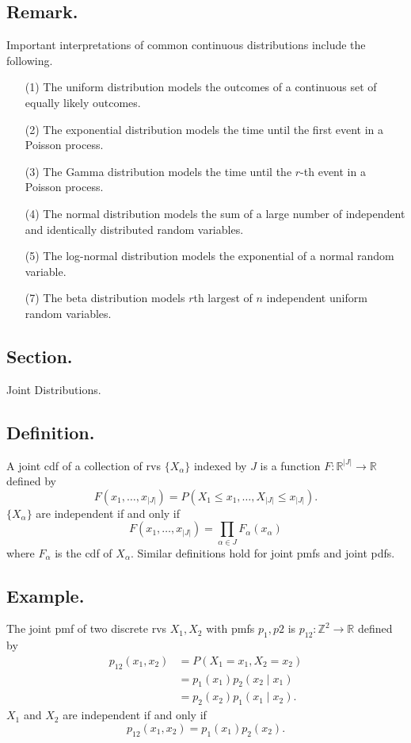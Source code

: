 \documentclass[titlepage]{article}
\begin{document}
\subsection{Remark.} Important interpretations of common continuous distributions include the following.
\begin{enumerate}
\item[(1)] The uniform distribution models the outcomes of a continuous set of equally likely outcomes.
\item[(2)] The exponential distribution models the time until the first event in a Poisson process.
\item[(3)] The Gamma distribution models the time until the $r$-th event in a Poisson process.
\item[(4)] The normal distribution models the sum of a large number of independent and identically distributed random variables.
\item[(5)] The log-normal distribution models the exponential of a normal random variable.
\item[(7)] The beta distribution models $r$th largest of $n$ independent uniform random variables.
\end{enumerate}

\newpage {}

\subsection{Section.} Joint Distributions.

\subsection{Definition.} A joint cdf of a collection of rvs $\{X_{\alpha}\}$ indexed by $J$ is a function $F: \mathbb{R}^{|J|} \to \mathbb{R}$ defined by 
$$F(x_{1}, \ldots, x_{|J|}) = P(X_{1} \leq x_{1}, \ldots, X_{|J|} \leq x_{|J|}).$$
$\{X_{\alpha}\}$ are independent if and only if
$$F(x_{1}, \ldots, x_{|J|}) = \prod_{\alpha \in J}F_{\alpha}(x_{\alpha})$$
where $F_{\alpha}$ is the cdf of $X_{\alpha}$. Similar definitions hold for joint pmfs and joint pdfs.

\subsection{Example.} The joint pmf of two discrete rvs $X_{1}, X_{2}$ with pmfs $p_{1}, p{2}$ is $p_{12}: \mathbb{Z}^{2} \to \mathbb{R}$ defined by
\begin{align*}
    p_{12}(x_{1}, x_{2}) &= P(X_{1} = x_{1}, X_{2} = x_{2}) \\
                         &= p_{1}(x_{1})p_{2}(x_{2} \mid x_{1}) \\
                         &= p_{2}(x_{2})p_{1}(x_{1} \mid x_{2}).
\end{align*}
$X_{1}$ and $X_{2}$ are independent if and only if
$$p_{12}(x_{1}, x_{2}) = p_{1}(x_{1})p_{2}(x_{2}).$$
\end{document}
